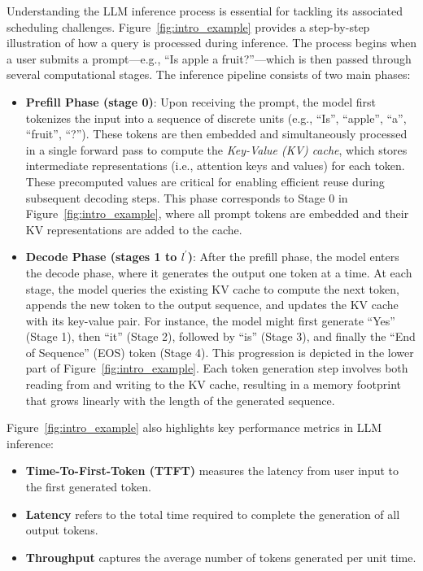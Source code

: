 Understanding the LLM inference process is essential for tackling its associated scheduling challenges. Figure~\ref{fig:intro_example} provides a step-by-step illustration of how a query is processed during inference. The process begins when a user submits a prompt—e.g., ``Is apple a fruit?''—which is then passed through several computational stages. The inference pipeline consists of two main phases:
\begin{itemize}
    \item \textbf{Prefill Phase (stage 0)}: Upon receiving the prompt, the model first tokenizes the input into a sequence of discrete units (e.g., ``Is'', ``apple'', ``a'', ``fruit'', ``?''). These tokens are then embedded and simultaneously processed in a single forward pass to compute the \textit{Key-Value (KV) cache}, which stores intermediate representations (i.e., attention keys and values) for each token. These precomputed values are critical for enabling efficient reuse during subsequent decoding steps. This phase corresponds to Stage 0 in Figure~\ref{fig:intro_example}, where all prompt tokens are embedded and their KV representations are added to the cache.

    \item \textbf{Decode Phase (stages 1 to $l^\prime$)}: After the prefill phase, the model enters the decode phase, where it generates the output one token at a time. At each stage, the model queries the existing KV cache to compute the next token, appends the new token to the output sequence, and updates the KV cache with its key-value pair. For instance, the model might first generate ``Yes'' (Stage 1), then ``it'' (Stage 2), followed by ``is'' (Stage 3), and finally the ``End of Sequence'' (EOS) token (Stage 4). This progression is depicted in the lower part of Figure~\ref{fig:intro_example}. Each token generation step involves both reading from and writing to the KV cache, resulting in a memory footprint that grows linearly with the length of the generated sequence.
\end{itemize}

Figure~\ref{fig:intro_example} also highlights key performance metrics in LLM inference:
\begin{itemize}
    \item \textbf{Time-To-First-Token (TTFT)} measures the latency from user input to the first generated token.
    \item \textbf{Latency} refers to the total time required to complete the generation of all output tokens.
    \item \textbf{Throughput} captures the average number of tokens generated per unit time.
\end{itemize}

